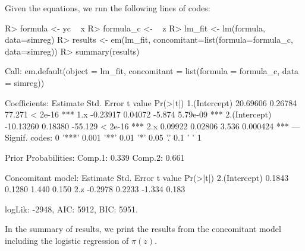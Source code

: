 \documentclass[nojss]{jss}
\begin{document}
Given the equations, we run the following lines of codes:
\begin{Schunk}
\begin{Sinput}
R> formula <- yc ~ x
R> formula_c <- ~ z
R> lm_fit <- lm(formula, data=simreg)
R> results <- em(lm_fit, concomitant=list(formula=formula_c, data=simreg))
R> summary(results)
\end{Sinput}
\begin{Soutput}
Call:
em.default(object = lm_fit, concomitant = list(formula = formula_c, 
    data = simreg))

Coefficients: 
               Estimate Std. Error t value Pr(>|t|)    
1.(Intercept)  20.69606    0.26784  77.271  < 2e-16 ***
1.x            -0.23917    0.04072  -5.874 5.79e-09 ***
2.(Intercept) -10.13260    0.18380 -55.129  < 2e-16 ***
2.x             0.09922    0.02806   3.536 0.000424 ***
---
Signif. codes:  0 '***' 0.001 '**' 0.01 '*' 0.05 '.' 0.1 ' ' 1

Prior Probabilities: 
Comp.1: 0.339
Comp.2: 0.661

Concomitant model: 
              Estimate Std. Error t value Pr(>|t|)
2.(Intercept)   0.1843     0.1280   1.440    0.150
2.z            -0.2978     0.2233  -1.334    0.183

logLik: -2948, AIC: 5912, BIC: 5951. 
\end{Soutput}
\end{Schunk}
In the summary of results, we print the results from the concomitant model including the logistic regression of $\pi(z)$.
\end{document}
